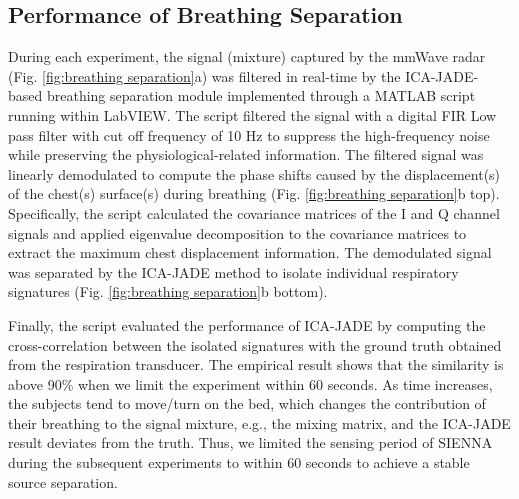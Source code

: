 \subsection{Performance of Breathing Separation}
During each experiment, the signal (mixture) captured by the mmWave radar (Fig. \ref{fig:breathing separation}a) was filtered in real-time by the ICA-JADE-based breathing separation module implemented through a MATLAB script running within LabVIEW. The script filtered the signal with a digital FIR Low pass filter with cut off frequency of 10 Hz to suppress the high-frequency noise while preserving the physiological-related information. The filtered signal was linearly demodulated to compute the phase shifts caused by the displacement(s) of the chest(s) surface(s) during breathing (Fig. \ref{fig:breathing separation}b top). Specifically, the script calculated the covariance matrices of the I and Q channel signals and applied eigenvalue decomposition to the covariance matrices to extract the maximum chest displacement information. The demodulated signal was separated by the ICA-JADE method to isolate individual respiratory signatures (Fig. \ref{fig:breathing separation}b bottom). 

Finally, the script evaluated the performance of ICA-JADE by computing the cross-correlation between the isolated signatures with the ground truth obtained from the respiration transducer. The empirical result shows that the similarity is above 90\% when we limit the experiment within 60 seconds. As time increases, the subjects tend to move/turn on the bed, which changes the contribution of their breathing to the signal mixture, e.g., the mixing matrix, and the ICA-JADE result deviates from the truth. Thus, we limited the sensing period of SIENNA during the subsequent experiments to within 60 seconds to achieve a stable source separation.


